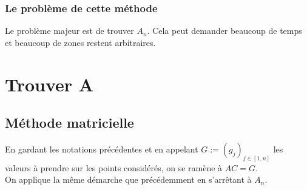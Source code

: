 \documentclass{article}
\begin{document}
	\subsubsection*{Le problème de cette méthode}
	Le problème majeur est de trouver $A_n$. Cela peut demander beaucoup de temps et beaucoup de zones restent arbitraires.

	\section{Trouver A}
	\subsection{Méthode matricielle}
	En gardant les notations précédentes et en appelant $G:=(g_j)_{j\in[1,n]}$ les valeurs à prendre sur les points considérés, on se ramène à $AC=G$.\\
	On applique la même démarche que précédemment en s'arrêtant à $A_n$.
\end{document}
